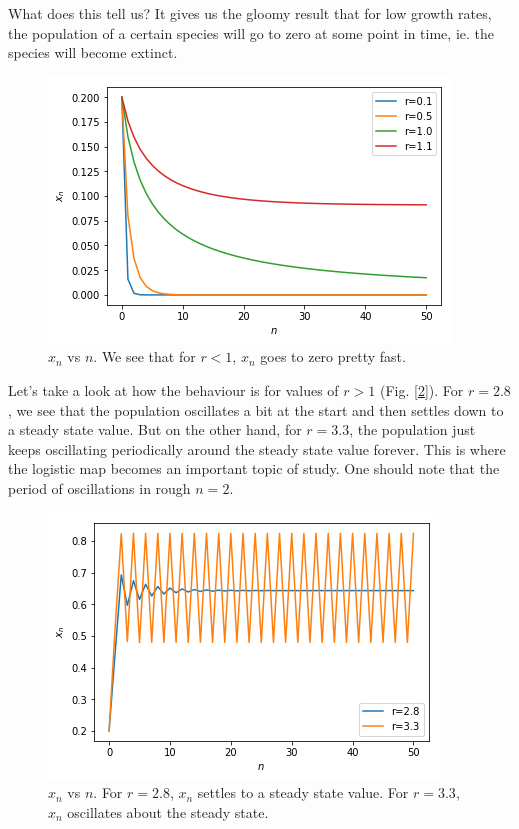 What does this tell us? It gives us the gloomy result that for low growth rates, the population of a certain species will go to zero at some point in time, ie. the species will become extinct.
\begin{figure}[h!]
	\centering
	\includegraphics[scale=0.8]{Figures/rle1.png}
	\caption[An Electron]{$x_n$ vs $n$. We see that for $r<1$, $x_n$ goes to zero pretty fast.}
	\label{fig:rle1}
\end{figure}

Let's take a look at how the behaviour is for values of $r>1$ (Fig. [\ref{fig:rinbetween}]). For $r=2.8$, we see that the population oscillates a bit at the start and then settles down to a steady state value. But on the other hand, for $r=3.3$, the population just keeps oscillating periodically around the steady state value forever. This is where the logistic map becomes an important topic of study. One should note that the period of oscillations in rough $n=2$. 
\begin{figure}[h!]
	\centering
	\includegraphics[scale=0.8]{Figures/rinbetween.png}
	\caption[An Electron]{$x_n$ vs $n$. For $r=2.8$, $x_n$ settles to a steady state value. For $r=3.3$, $x_n$ oscillates about the steady state.}
	\label{fig:rinbetween}
\end{figure}

